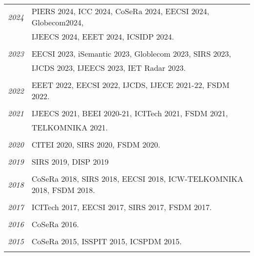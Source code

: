 \documentclass[paper=a4,fontsize=11pt]{scrartcl}
\begin{document}
\begin{longtable}{r|p{12cm}}
	\emph{2024} & PIERS 2024, ICC 2024, CoSeRa 2024, EECSI 2024, Globecom2024, \\
		& IJEECS 2024, EEET 2024, ICSIDP 2024. \\
	\multicolumn{2}{c}{} \\
	
	\emph{2023} & EECSI 2023, iSemantic 2023, Globlecom 2023, SIRS 2023, \\
		& IJCDS 2023, IJEECS 2023, IET Radar 2023. \\
	\multicolumn{2}{c}{} \\
	
	\emph{2022} & EEET 2022, EECSI 2022, IJCDS, IJECE 2021-22, FSDM 2022. \\
	\multicolumn{2}{c}{} \\
	
	\emph{2021} & IJEECS 2021, BEEI 2020-21, ICITech 2021, FSDM 2021, \\
		& TELKOMNIKA 2021. \\
	\multicolumn{2}{c}{} \\
	
	\emph{2020} & CITEI 2020, SIRS 2020, FSDM 2020. \\
	\multicolumn{2}{c}{} \\
	
	\emph{2019} & SIRS 2019, DISP 2019 \\
	\multicolumn{2}{c}{} \\
	
	\emph{2018} & CoSeRa 2018, SIRS 2018, EECSI 2018, ICW-TELKOMNIKA 2018, FSDM 2018.\\
	\multicolumn{2}{c}{} \\
	
	\emph{2017} & ICITech 2017, EECSI 2017, SIRS 2017, FSDM 2017.\\
	\multicolumn{2}{c}{} \\
	
	\emph{2016} & CoSeRa 2016.\\
	\multicolumn{2}{c}{} \\
	
	\emph{2015} & CoSeRa 2015, ISSPIT 2015, ICSPDM 2015.\\
	\multicolumn{2}{c}{} 
\end{longtable}


\end{document}
